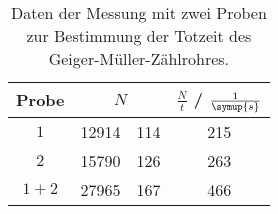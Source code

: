 \begin{table}[!htp]
\centering
\caption{Daten der Messung mit zwei Proben zur Bestimmung der Totzeit des Geiger-Müller-Zählrohres.}
\label{tab:tot}
\begin{tabular}{c S[table-format=5.0] @{${}\pm{}$} S[table-format=3.0] S[table-format=3.0]}
\toprule
{Probe} &  & {$\frac{N}{t}$ / $\frac{1}{\symup{s}}$} \\
\midrule
$1$ & 12914 & 114 & 215 \\
$2$ & 15790 & 126 & 263 \\
${1+2}$ & 27965 & 167 & 466 \\
\bottomrule
\end{tabular}
\end{table}